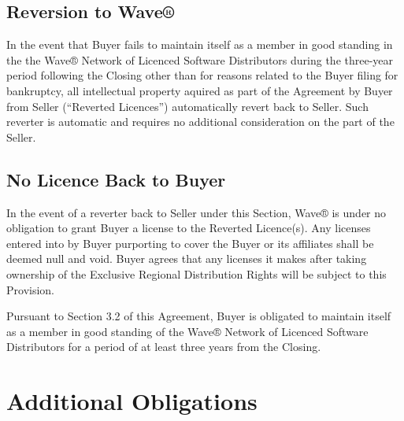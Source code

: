 \documentclass[letterpaper,10pt,english]{sphinxmanual}
\begin{document}
\subsection{Reversion to Wave®}
\label{\detokenize{4-reversionary:reversion-to-wave}}
In the event that Buyer fails to maintain itself as a member in good standing in the the Wave® Network of Licenced Software Distributors during the three-year period following the Closing other than for reasons related to the Buyer filing for bankruptcy, all intellectual property aquired as part of the Agreement by Buyer from Seller (“Reverted Licences”) automatically revert back to Seller. Such reverter is automatic and requires no additional consideration on the part of the Seller.


\subsection{No Licence Back to Buyer}
\label{\detokenize{4-reversionary:no-licence-back-to-buyer}}
In the event of a reverter back to Seller under this Section,  Wave® is under no obligation to grant Buyer a license to the Reverted Licence(s). Any licenses entered into by Buyer purporting to cover the Buyer or its affiliates shall be deemed null and void. Buyer agrees that any licenses it makes after taking ownership of the Exclusive Regional Distribution Rights will be subject to this Provision.

Pursuant to Section 3.2 of this Agreement, Buyer is obligated to maintain itself as a member in good standing of the Wave® Network of Licenced Software Distributors for a period of at least three years from the Closing.


\section{Additional Obligations}
\label{\detokenize{5-additionalobligations:additional-obligations}}\label{\detokenize{5-additionalobligations::doc}}
\end{document}
